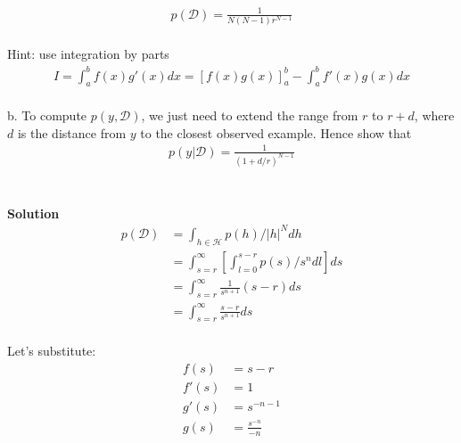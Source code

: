 \begin{align*}
p(\mathcal{D}) = \frac{1}{N(N-1)r^{N-1}} 
\end{align*}
\\
Hint: use integration by parts
\begin{align*}
I = \int_{a}^{b} f(x)g'(x)dx = [f(x)g(x)]_a^b - \int_a^b f'(x)g(x)dx
\end{align*}
\\
b. To compute $p(y, \mathcal{D})$, we just need to extend the range from $r$ to $r + d$, where $d$ is the distance from $y$ to
the closest observed example. Hence show that
\begin{align*}
p(y|\mathcal{D}) = \frac{1}{(1+d/r)^{N-1}}
\end{align*}
\\ \\
\textbf{Solution} \\
\begin{align*}
p(\mathcal{D}) &= \int_{h \in \mathcal{H}}p(h)/|h|^Ndh \\
&= \int_{s=r}^{\infty}\left[\int_{l=0}^{s-r}p(s)/s^ndl\right]ds \\
&= \int_{s=r}^{\infty}\frac{1}{s^{n+1}}(s-r)ds \\
&= \int_{s=r}^{\infty}\frac{s-r}{s^{n+1}}ds
\end{align*}
\\
Let's substitute: 
\begin{align*}
    f(s) &= s - r \\
    f'(s) &= 1 \\
    g'(s) &= s^{-n-1} \\
    g(s) &= \frac{s^{-n}}{-n}
\end{align*}